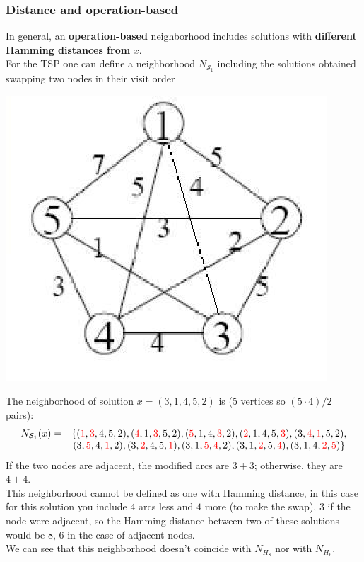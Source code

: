 \newpage

\subsubsection{Distance and operation-based}

In general, an \textbf{operation-based} neighborhood includes solutions with \textbf{different Hamming distances from} $x$.\\

For the TSP one can define a neighborhood $N_{\mathcal{S}_1}$ including the solutions obtained swapping two nodes in their visit order

\begin{center}
	\includegraphics[width=0.5\columnwidth]{img/TSP2}
\end{center}

The neighborhood of solution $x = (3, 1, 4, 5, 2)$ is ($5$ vertices so $(5 \cdot 4) / 2$ pairs):
$$ \begin{array}{c c}
	N_{\mathcal{S}_1} (x) = & \{({\color{red} 1}, {\color{red} 3}, 4, 5, 2) , ({\color{red} 4}, 1, {\color{red} 3}, 5, 2) , ({\color{red} 5}, 1, 4, {\color{red} 3}, 2) , ({\color{red} 2}, 1, 4, 5, {\color{red} 3}) , (3, {\color{red} 4}, {\color{red} 1}, 5, 2) , \\
	& (3, {\color{red} 5}, 4, {\color{red} 1}, 2) , (3, {\color{red} 2}, 4, 5, {\color{red} 1}) , (3, 1, {\color{red} 5}, {\color{red} 4}, 2) , (3, 1, {\color{red} 2}, 5, {\color{red} 4}) , (3, 1, 4, {\color{red} 2}, {\color{red} 5}) \}
\end{array} $$
If the two nodes are adjacent, the modified arcs are $3 + 3$; otherwise, they are $4 + 4$.\\

This neighborhood cannot be defined as one with Hamming distance, in this case for this solution you include $4$ arcs less and $4$ more (to make the swap), $3$ if the node were adjacent, so the Hamming distance between two of these solutions would be $8$, $6$ in the case of adjacent nodes.\\
We can see that this neighborhood doesn't coincide with $N_{H_8}$ nor with $N_{H_6}$.\\

